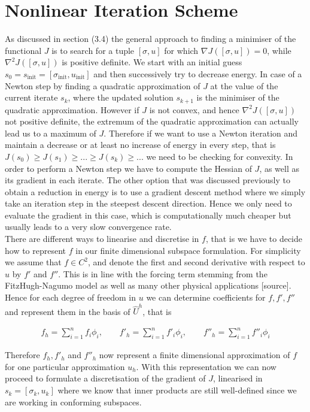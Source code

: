 \documentclass[../draft_1.tex]{subfiles}
\begin{document}
\section{Nonlinear Iteration Scheme}
As discussed in section (3.4) the general approach to finding a minimiser of the functional $J$ is to search for a tuple $[\sigma, u]$ for which $\nabla  J ([\sigma, u])= 0$, while $\nabla^2 J ([\sigma, u]) $ is positive definite. We start with an initial guess $s_0 = s_{\text{init}} = [\sigma_{\text{init}}, u_{\text{init}}]$ and then successively try to decrease energy. In case of a Newton step by finding a quadratic approximation of $J$ at the value of the current iterate $s_k$, where the updated solution $s_{k+1}$ is the minimiser of the quadratic approximation. However if $J$ is not convex, and hence $\nabla^2 J ([\sigma, u]) $ not positive definite, the extremum of the quadratic approximation can actually lead us to a maximum of $J$. Therefore if we want to use a Newton iteration and maintain a decrease or at least no increase of energy in every step, that is $J(s_0) \geq J(s_1) \geq ... \geq J(s_k) \geq ... $ we need to be checking for convexity. In order to perform a Newton step we have to compute the Hessian of $J$, as well as its gradient in each iterate. The other option that was discussed previously to obtain a reduction in energy is to use a gradient descent method where we simply take an iteration step in the steepest descent direction. Hence we only need to evaluate the gradient in this case, which is computationally much cheaper but usually leads to a very slow convergence rate.
\smallskip
\\
There are different ways to linearise and discretise in $f$, that is we have to decide how to represent $f$ in our finite dimensional subspace formulation. For simplicity we assume that $f \in C^2$, and denote the first and second derivative with respect to $u$ by $f'$ and $f''$. This is in line with the forcing term stemming from the FitzHugh-Nagumo model as well as many other physical applications [source]. Hence for each degree of freedom in $u$ we can determine coefficients for $f, f', f''$ and represent them in the basis of $\hat{U}^h$, that is 
\begin{ceqn}
	\begin{align}
f_h= \sum_{i=1}^{n} f_i \phi_i, \qquad f'_h = \sum_{i=1}^{n} f'_i \phi_i, \qquad  f''_h = \sum_{i=1}^{n} f''_i \phi_i
	\end{align}
\end{ceqn}
Therefore $f_h, f'_h$ and $f''_h$ now represent a finite dimensional approximation of $f$ for one particular approximation $u_h$. With this representation we can now proceed to formulate a discretisation of the gradient of $J$, linearised in $s_k = [\sigma_k, u_k]$ where we know that inner products are still well-defined since we are working in conforming subspaces.
\end{document}
